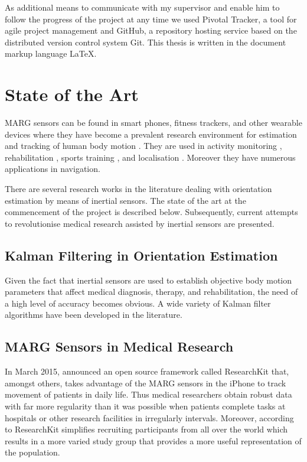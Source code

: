 As additional means to communicate with my supervisor and enable him to follow the progress of the project at any time we used Pivotal Tracker, a tool for agile project management and GitHub, a repository hosting service based on the distributed version control system Git. This thesis is written in the document markup language \LaTeX{}.

\section{State of the Art}

MARG sensors can be found in smart phones, fitness trackers, and other wearable devices where they have become a prevalent research environment for estimation and tracking of human body motion \cite{bennett_motion_2014}. They are used in activity monitoring \cite{veltink_detection_96}\cite{najafi_ambulatory_03}\cite{ermes_sports_08}, rehabilitation \cite{giggins_rehabilitation_13}\cite{lupinski_ligament_11}, sports training \cite{bonnet_squat_13}\cite{ermes_sports_08}, and localisation \cite{hoflinger_localization_13}\cite{Bennett_distance_13}. Moreover they have numerous applications in navigation.

There are several research works in the literature dealing with orientation estimation by means of inertial sensors. The state of the art at the commencement of the project is described below. Subsequently, current attempts to revolutionise medical research assisted by inertial sensors are presented.

\subsection{Kalman Filtering in Orientation Estimation}

Given the fact that inertial sensors are used to establish objective body motion parameters that affect medical diagnosis, therapy, and rehabilitation, the need of a high level of accuracy becomes obvious. A wide variety of Kalman filter algorithms have been developed in the literature.

\subsection{MARG Sensors in Medical Research}

In March 2015, \citeauthor{Apple_2015} announced an open source framework called ResearchKit \cite{Apple_2015} that, amongst others, takes advantage of the MARG sensors in the iPhone to track movement of patients in daily life. Thus medical researchers obtain robust data with far more regularity than it was possible when patients complete tasks at hospitals or other research facilities in irregularly intervals. Moreover, according to \citeauthor{Apple_2015} ResearchKit simplifies recruiting participants from all over the world which results in a more varied study group that provides a more useful representation of the population.

